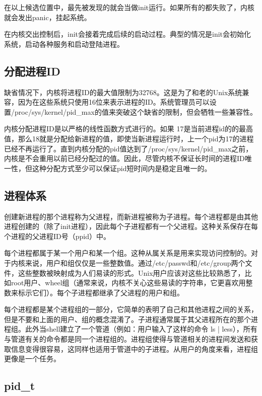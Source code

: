 在以上候选位置中，最先被发现的就会当做init运行。如果所有的都失败了，内核就会发出panic，挂起系统。

在内核交出控制后，init会接着完成后续的启动过程。典型的情况是init会初始化系统，启动各种服务和启动登陆进程。

\subsection{分配进程ID}

缺省情况下，内核将进程ID的最大值限制为32768。这是为了和老的Unix系统兼容，因为在这些系统只使用16位来表示进程的ID。系统管理员可以设置/proc/sys/kernel/pid\_max的值来突破这个缺省的限制，但会牺牲一些兼容性。

内核分配进程ID是以严格的线性函数方式进行的。如果 17是当前进程id的的最高值，那么18就是分配给新进程的值，即使当新进程运行时，上一个pid为17的进程已经不再运行了。直到内核分配的pid值达到了/proc/sys/kernel/pid\_max之前，内核是不会重用以前已经分配过的值。因此，尽管内核不保证长时间的进程ID唯一性，但这种分配方式至少可以保证pid短时间内是稳定且唯一的。
 
\subsection{进程体系}

创建新进程的那个进程称为父进程，而新进程被称为子进程。每个进程都是由其他进程创建的（除了init进程），因此每个子进程都有一个父进程。这种关系保存在每个进程的父进程ID号（ppid）中。

每个进程都属于某一个用户和某一个组。这种从属关系是用来实现访问控制的。对于内核来说，用户和组仅仅是一些整数值。通过/etc/passwd和/etc/group两个文件，这些整数被映射成为人们易读的形式。Unix用户应该对这些比较熟悉了，比如root用户、wheel组（通常来说，内核不关心这些易读的字符串，它更喜欢用整数来标示它们）。每个子进程都继承了父进程的用户和组。

每个进程都是某个进程组的一部分，它简单的表明了自己和其他进程之间的关系，但是不要和上面的用户、组的概念混淆了。子进程通常属于其父进程所在的那个进程组。此外当shell建立了一个管道（例如：用户输入了这样的命令 ls | less），所有与管道有关的命令都是同一个进程组的。进程组使得与管道相关的进程间发送和获取信息变得很容易，这同样也适用于管道中的子进程。从用户的角度来看，进程组更像是一个任务。

\subsection{pid\_t}


